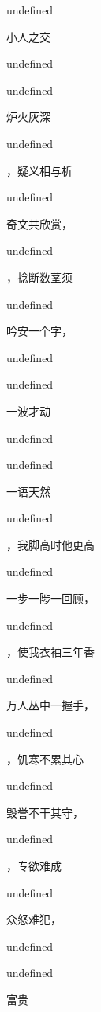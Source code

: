 \documentclass[12pt, a4paper, addpoints]{exam}
\begin{document}
\begin{multicols}{2}
\begin{questions}
undefined

\question[2] 小人之交\fillin

undefined

\question[2] 

undefined

\question[2] 炉火灰深\fillin

undefined

\question[2] \fillin，疑义相与析

undefined

\question[2] 奇文共欣赏，\fillin

undefined

\question[2] \fillin，捻断数茎须

undefined

\question[2] 吟安一个字，\fillin

undefined

\question[2] 

undefined

\question[2] 一波才动\fillin

undefined

\question[2] 

undefined

\question[2] 一语天然\fillin

undefined

\question[2] \fillin，我脚高时他更高

undefined

\question[2] 一步一陟一回顾，\fillin

undefined

\question[2] \fillin，使我衣袖三年香

undefined

\question[2] 万人丛中一握手，\fillin

undefined

\question[2] \fillin，饥寒不累其心

undefined

\question[2] 毁誉不干其守，\fillin

undefined

\question[2] \fillin，专欲难成

undefined

\question[2] 众怒难犯，\fillin

undefined

\question[2] 

undefined

\question[2] 富贵


\end{questions}
\end{multicols}
\end{document}
